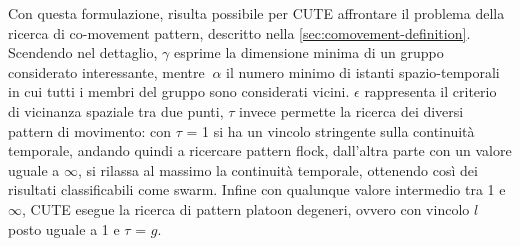 Con questa formulazione, risulta possibile per CUTE affrontare il problema
della ricerca di co-movement pattern, descritto nella \cref{sec:comovement-definition}.
Scendendo nel dettaglio, \(\gamma \) esprime la dimensione minima di un gruppo considerato interessante, mentre
\(~\alpha \) il numero minimo di istanti spazio-temporali in cui tutti i membri del gruppo sono considerati vicini.
\(\epsilon \) rappresenta il criterio di vicinanza spaziale tra due punti, \(\tau \) invece permette la ricerca dei diversi pattern di movimento:
con \(\tau \) = 1 si ha un vincolo stringente sulla continuità temporale, andando quindi a ricercare pattern flock,
dall'altra parte con un valore uguale a \(\infty \), si rilassa al massimo la continuità temporale, ottenendo
così dei risultati classificabili come swarm. Infine con qualunque valore intermedio tra 1 e  \(\infty \),
CUTE esegue la ricerca di pattern platoon degeneri, ovvero con vincolo \(l\) posto uguale a 1 e \(\tau\) = \(g\).